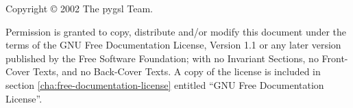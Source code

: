 Copyright \copyright{} 2002 The pygsl Team.

Permission is granted to copy, distribute and/or modify this document under the
terms of the GNU Free Documentation License, Version 1.1 or any later version
published by the Free Software Foundation; with no Invariant Sections, no
Front-Cover Texts, and no Back-Cover Texts.  A copy of the license is included
in section \ref{cha:free-documentation-license} entitled ``GNU Free
Documentation License''.


